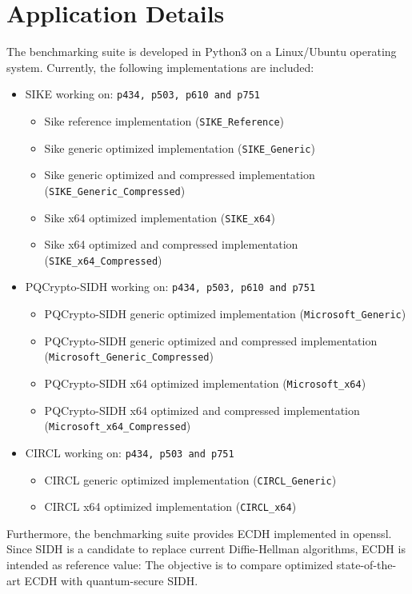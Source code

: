 \section{Application Details}\label{sec:benchmarks_details}
The benchmarking suite is developed in Python3 on a Linux/Ubuntu operating system. Currently, the following implementations are included:
\label{sec:included_implementations}
\begin{itemize}
\item \gls{SIKE} working on: \texttt{p434, p503, p610 and p751}
	\begin{itemize}
	\item Sike reference implementation (\texttt{SIKE\_Reference})
	\item Sike generic optimized implementation (\texttt{SIKE\_Generic})
	\item Sike generic optimized and compressed implementation (\texttt{SIKE\_Generic\_Compressed})
	\item Sike x64 optimized implementation (\texttt{SIKE\_x64})
	\item Sike x64 optimized and compressed implementation (\texttt{SIKE\_x64\_Compressed})
	\end{itemize}
\item \gls{PQCrypto-SIDH} working on: \texttt{p434, p503, p610 and p751}
	\begin{itemize}
	\item PQCrypto-SIDH generic optimized implementation (\texttt{Microsoft\_Generic})
	\item PQCrypto-SIDH generic optimized and compressed implementation \\ (\texttt{Microsoft\_Generic\_Compressed})
	\item PQCrypto-SIDH x64 optimized implementation (\texttt{Microsoft\_x64})
	\item PQCrypto-SIDH x64 optimized and compressed implementation \\ (\texttt{Microsoft\_x64\_Compressed})
	\end{itemize}
\item CIRCL working on: \texttt{p434, p503 and p751}
	\begin{itemize}
	\item CIRCL generic optimized implementation (\texttt{CIRCL\_Generic})
	\item CIRCL x64 optimized implementation (\texttt{CIRCL\_x64})
	\end{itemize}
\end{itemize}
Furthermore, the benchmarking suite provides \gls{ECDH} implemented in \gls{openssl}. Since \gls{SIDH} is a candidate to replace current Diffie-Hellman algorithms, \gls{ECDH} is intended as reference value: The objective is to compare optimized state-of-the-art \gls{ECDH} with quantum-secure \gls{SIDH}.\\
